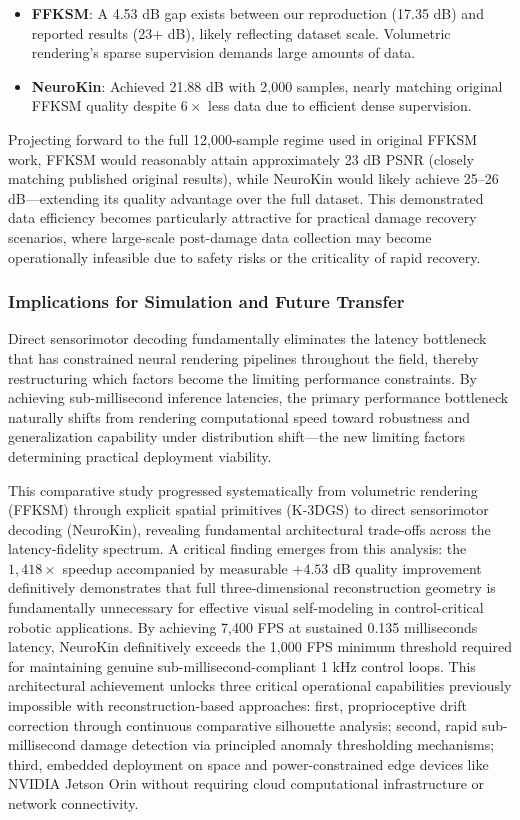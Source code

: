 ﻿\documentclass[11pt,a4paper]{article}
\begin{document}
\begin{itemize}
\item \textbf{FFKSM}: A 4.53 dB gap exists between our reproduction (17.35 dB) and reported results (23+ dB), likely reflecting dataset scale. Volumetric rendering's sparse supervision demands large amounts of data.
\item \textbf{NeuroKin}: Achieved 21.88 dB with 2,000 samples, nearly matching original FFKSM quality despite $6\times$ less data due to efficient dense supervision.
\end{itemize}

Projecting forward to the full 12,000-sample regime used in original FFKSM work, FFKSM would reasonably attain approximately 23 dB PSNR (closely matching published original results), while NeuroKin would likely achieve 25–26 dB—extending its quality advantage over the full dataset. This demonstrated data efficiency becomes particularly attractive for practical damage recovery scenarios, where large-scale post-damage data collection may become operationally infeasible due to safety risks or the criticality of rapid recovery.

\subsubsection{Implications for Simulation and Future Transfer}

Direct sensorimotor decoding fundamentally eliminates the latency bottleneck that has constrained neural rendering pipelines throughout the field, thereby restructuring which factors become the limiting performance constraints. By achieving sub-millisecond inference latencies, the primary performance bottleneck naturally shifts from rendering computational speed toward robustness and generalization capability under distribution shift—the new limiting factors determining practical deployment viability.

This comparative study progressed systematically from volumetric rendering (FFKSM) through explicit spatial primitives (K-3DGS) to direct sensorimotor decoding (NeuroKin), revealing fundamental architectural trade-offs across the latency-fidelity spectrum. A critical finding emerges from this analysis: the $1,418\times$ speedup accompanied by measurable $+4.53$ dB quality improvement definitively demonstrates that full three-dimensional reconstruction geometry is fundamentally unnecessary for effective visual self-modeling in control-critical robotic applications. By achieving 7,400 FPS at sustained 0.135 milliseconds latency, NeuroKin definitively exceeds the 1,000 FPS minimum threshold required for maintaining genuine sub-millisecond-compliant 1 kHz control loops. This architectural achievement unlocks three critical operational capabilities previously impossible with reconstruction-based approaches: first, proprioceptive drift correction through continuous comparative silhouette analysis; second, rapid sub-millisecond damage detection via principled anomaly thresholding mechanisms; third, embedded deployment on space and power-constrained edge devices like NVIDIA Jetson Orin without requiring cloud computational infrastructure or network connectivity. 
\end{document}
